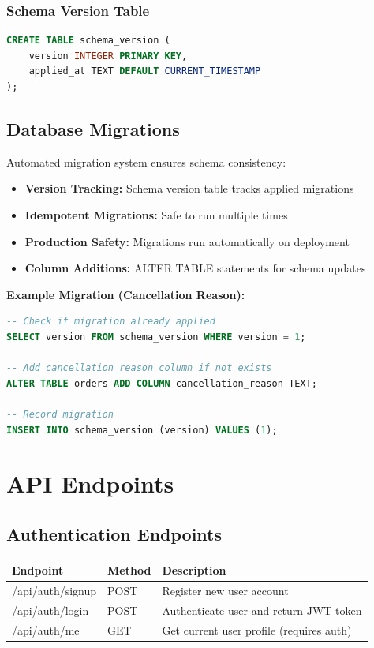 \documentclass[12pt,a4paper]{article}
\begin{document}
\subsubsection{Schema Version Table}
\begin{lstlisting}[language=SQL]
CREATE TABLE schema_version (
    version INTEGER PRIMARY KEY,
    applied_at TEXT DEFAULT CURRENT_TIMESTAMP
);
\end{lstlisting}

\subsection{Database Migrations}

Automated migration system ensures schema consistency:

\begin{itemize}[leftmargin=*]
    \item \textbf{Version Tracking:} Schema version table tracks applied migrations
    \item \textbf{Idempotent Migrations:} Safe to run multiple times
    \item \textbf{Production Safety:} Migrations run automatically on deployment
    \item \textbf{Column Additions:} ALTER TABLE statements for schema updates
\end{itemize}

\textbf{Example Migration (Cancellation Reason):}
\begin{lstlisting}[language=SQL]
-- Check if migration already applied
SELECT version FROM schema_version WHERE version = 1;

-- Add cancellation_reason column if not exists
ALTER TABLE orders ADD COLUMN cancellation_reason TEXT;

-- Record migration
INSERT INTO schema_version (version) VALUES (1);
\end{lstlisting}

\newpage

\section{API Endpoints}


\subsection{Authentication Endpoints}

\begin{longtable}{|p{3cm}|p{2cm}|p{8cm}|}
\hline
\textbf{Endpoint} & \textbf{Method} & \textbf{Description} \\
\hline
/api/auth/signup & POST & Register new user account \\
\hline
/api/auth/login & POST & Authenticate user and return JWT token \\
\hline
/api/auth/me & GET & Get current user profile (requires auth) \\
\hline
\end{longtable}
\end{document}
